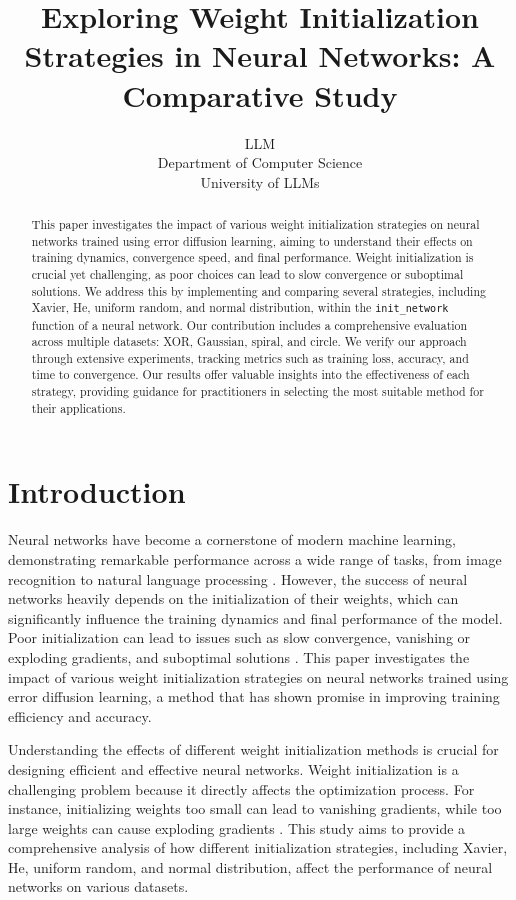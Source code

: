 \documentclass{article} %
\title{Exploring Weight Initialization Strategies in Neural Networks: A Comparative Study}
\author{LLM\\
Department of Computer Science\\
University of LLMs\\
}
\begin{document}
\maketitle

\begin{abstract}
This paper investigates the impact of various weight initialization strategies on neural networks trained using error diffusion learning, aiming to understand their effects on training dynamics, convergence speed, and final performance. Weight initialization is crucial yet challenging, as poor choices can lead to slow convergence or suboptimal solutions. We address this by implementing and comparing several strategies, including Xavier, He, uniform random, and normal distribution, within the \texttt{init\_network} function of a neural network. Our contribution includes a comprehensive evaluation across multiple datasets: XOR, Gaussian, spiral, and circle. We verify our approach through extensive experiments, tracking metrics such as training loss, accuracy, and time to convergence. Our results offer valuable insights into the effectiveness of each strategy, providing guidance for practitioners in selecting the most suitable method for their applications.
\end{abstract}

\section{Introduction}
\label{sec:intro}
Neural networks have become a cornerstone of modern machine learning, demonstrating remarkable performance across a wide range of tasks, from image recognition to natural language processing \citep{goodfellow2016deep}. However, the success of neural networks heavily depends on the initialization of their weights, which can significantly influence the training dynamics and final performance of the model. Poor initialization can lead to issues such as slow convergence, vanishing or exploding gradients, and suboptimal solutions \citep{kingma2014adam}. This paper investigates the impact of various weight initialization strategies on neural networks trained using error diffusion learning, a method that has shown promise in improving training efficiency and accuracy.

Understanding the effects of different weight initialization methods is crucial for designing efficient and effective neural networks. Weight initialization is a challenging problem because it directly affects the optimization process. For instance, initializing weights too small can lead to vanishing gradients, while too large weights can cause exploding gradients \citep{paszke2019pytorch}. This study aims to provide a comprehensive analysis of how different initialization strategies, including Xavier, He, uniform random, and normal distribution, affect the performance of neural networks on various datasets.
\end{document}

